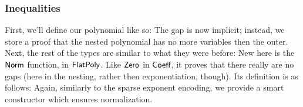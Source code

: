 \documentclass[draft, twocolumn]{article}
\begin{document}
\subsubsection{Inequalities}
First, we'll define our polynomial like so:
The gap is now implicit; instead, we store a proof that the nested polynomial
has no more variables then the outer. Next, the rest of the types are similar to
what they were before:
New here is the \(\AgdaFunction{Norm}\) function, in
\(\AgdaDatatype{FlatPoly}\). Like \(\AgdaFunction{Zero}\) in
\(\AgdaDatatype{Coeff}\), it proves that there really are no gaps (here in the
nesting, rather then exponentiation, though). Its definition is as follows:
Again, similarly to the sparse exponent encoding, we provide a smart
constructor which ensures normalization.
\end{document}
